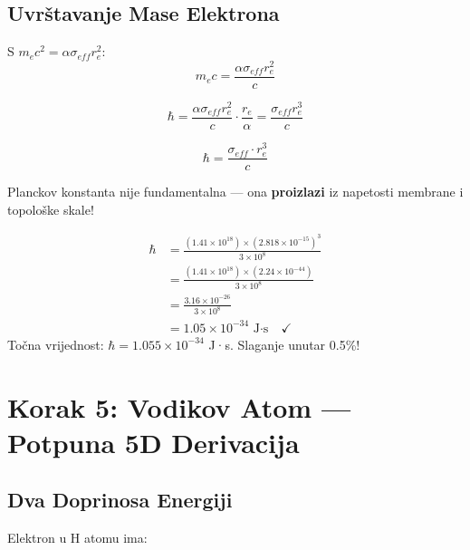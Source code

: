 \documentclass[12pt,a4paper]{article}
\begin{document}
\subsection{Uvrštavanje Mase Elektrona}

S $m_e c^2 = \alpha \sigma_{eff} r_e^2$:
\begin{equation}
m_e c = \frac{\alpha \sigma_{eff} r_e^2}{c}
\end{equation}

\begin{equation}
\hbar = \frac{\alpha \sigma_{eff} r_e^2}{c} \cdot \frac{r_e}{\alpha} = \frac{\sigma_{eff} r_e^3}{c}
\end{equation}

\begin{keyresult}
\begin{equation}
\boxed{\hbar = \frac{\sigma_{eff} \cdot r_e^3}{c}}
\end{equation}

Planckov konstanta nije fundamentalna — ona \textbf{proizlazi} iz napetosti membrane i topološke skale!
\end{keyresult}

\begin{numerical}
\begin{align*}
\hbar &= \frac{(1.41 \times 10^{18}) \times (2.818 \times 10^{-15})^3}{3 \times 10^8} \\
&= \frac{(1.41 \times 10^{18}) \times (2.24 \times 10^{-44})}{3 \times 10^8} \\
&= \frac{3.16 \times 10^{-26}}{3 \times 10^8} \\
&= 1.05 \times 10^{-34} \text{ J·s} \quad \checkmark
\end{align*}
Točna vrijednost: $\hbar = 1.055 \times 10^{-34}$ J·s. Slaganje unutar 0.5\%!
\end{numerical}

\section{Korak 5: Vodikov Atom — Potpuna 5D Derivacija}

\subsection{Dva Doprinosa Energiji}

Elektron u H atomu ima:
\end{document}
